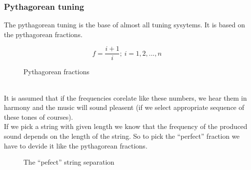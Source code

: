 \documentclass[]{article}
\begin{document}
            \subsubsection {Pythagorean tuning} 
                The pythagorean tuning is the base of almost all tuning sysytems. It is based on the pythagorean fractions.\\
                \begin{figure}[h]
                    $$f = \frac{i + 1}{i} ;\ i = 1, 2, ..., n$$
                    \caption{Pythagorean fractions}
                \end{figure}\\
                It is assumed that if the frequencies corelate like these numbers, we hear them in harmony and the music will sound pleasent (if we select appropriate sequence of these tones of courses).\\
                If we pick a string with given length we know that the frequency of the produced sound depends on the length of the string. So to pick the ``perfect'' fraction we have to devide it like the pythagorean fractions.
                \begin{figure}[h]
                    \begin{center}
                        \caption{The ``pefect'' string separation}            
                    \end{center}
                \end{figure}
\end{document}
